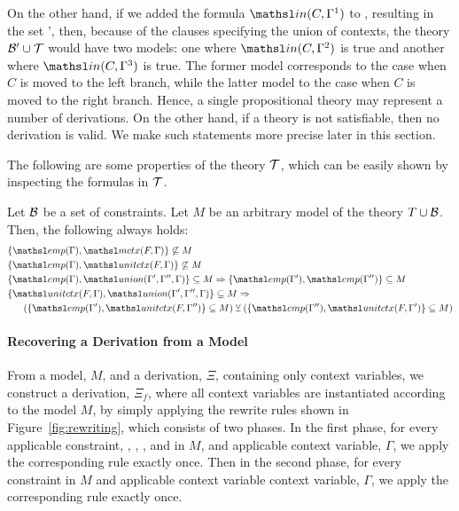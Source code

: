 On the other hand, if we added the formula $\In{C}{\Gamma^1}$ to
\groundSet,
resulting in the set \groundSet', then, because of the clauses specifying
the union of contexts, the theory $\mathcal{B}' \cup
{\cal T}$ would have two models: one where $\In{C}{\Gamma^2}$ is true and
another where $\In{C}{\Gamma^3}$ is true. The former model corresponds
to the case when $C$ is moved to the left branch, while the latter model
to the case when $C$ is moved to the right branch. Hence, a single
propositional theory may represent a number of derivations. On the other
hand, if a theory is not satisfiable, then no derivation is valid.
We make such statements more precise later in this section.

The following are some properties of the theory ${\cal T}$, which can be
easily shown by inspecting the formulas in ${\cal T}$.

\vspace{-2mm}
\begin{proposition}
\label{lemma:crit_pairs}
Let $\mathcal{B}$ be a set of constraints. Let $M$ be an arbitrary model of
the theory $T \cup
\mathcal{B}$. Then, the following always holds:
\begin{align}
&\{ \emp{\Gamma}, \mctx{F}{\Gamma} \} \not\subseteq M \label{em} \\
&\{ \emp{\Gamma}, \elin{F}{\Gamma} \} \not\subseteq M \label{ee} \\
&\{ \emp{\Gamma}, \union{\Gamma'}{\Gamma''}{\Gamma} \} \subseteq M
\Rightarrow \{ 
    \emp{\Gamma'}, \emp{\Gamma''} \} \subseteq M \label{eu} \\
&\{ \elin{F}{\Gamma}, \union{\Gamma'}{\Gamma''}{\Gamma} \} \subseteq M
\Rightarrow \nonumber \\ 
& \quad ~~ (\{ \emp{\Gamma'}, \elin{F}{\Gamma''} \} \subseteq M) \xor
(\{ \emp{\Gamma''}, \elin{F}{\Gamma'} \} \subseteq M) \label{elun}
\end{align}
\end{proposition}

\paragraph{Recovering a Derivation from a Model} 
From a model, $M$, and a derivation, $\Xi$, containing only context
variables, we construct a derivation, $\Xi_f$, where all context variables
are instantiated according to the model $M$, by simply applying the
rewrite rules shown in Figure~\ref{fig:rewriting}, which consists of two
phases. In the first phase, for every applicable constraint, ,
, , and  in $M$, and applicable context
variable, $\Gamma$, we apply the corresponding rule exactly once. 
Then in the second phase, for every  constraint in $M$ and
applicable context variable context variable, $\Gamma$, we apply the
corresponding rule exactly once. 

